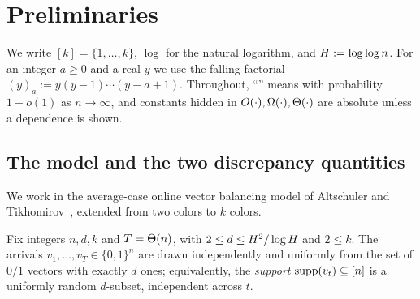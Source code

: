 \section{Preliminaries}\label{sec:prelims}

We write $[k]=\{1,\dots,k\}$, $\log$ for the natural logarithm, and $H:=\log\log n$.
For an integer $a\ge 0$ and a real $y$ we use the falling factorial $(y)_a:=y(y-1)\cdots(y-a+1)$.
Throughout, ``\whp'' means with probability $1-o(1)$ as $n\to\infty$, and constants hidden in
$O(\cdot),\Omega(\cdot),\Theta(\cdot)$ are absolute unless a dependence is shown.

\subsection{The model and the two discrepancy quantities}\label{sec:model}

We work in the average-case online vector balancing model of Altschuler and Tikhomirov~\cite{AT2025},
extended from two colors to $k$ colors.

\begin{definition}\label{def:model}
Fix integers $n,d,k$ and $T=\Theta(n)$, with $2\le d\le H^2/\log H$ and $2\le k$.
The arrivals $v_1,\dots,v_T\in\{0,1\}^n$ are drawn independently and uniformly from the set of $0/1$ vectors
with exactly $d$ ones; equivalently, the \emph{support} $\mathrm{supp}(v_t)\subseteq[n]$ is a uniformly random
$d$-subset, independent across $t$.
\end{definition}

